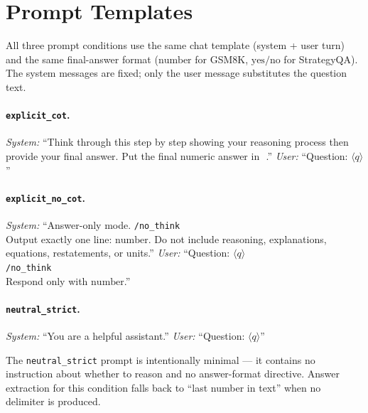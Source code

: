 \documentclass{article}
\theoremstyle{plain}
\theoremstyle{definition}
\theoremstyle{remark}
\begin{document}




\appendix

\section{Prompt Templates}
\label{app:prompts}

All three prompt conditions use the same chat template (system + user
turn) and the same final-answer format ($\boxed{\text{number}}$ for
GSM8K, $\boxed{\text{yes/no}}$ for StrategyQA). The system messages are
fixed; only the user message substitutes the question text.

\paragraph{\texttt{explicit\_cot}.}
\textit{System:}
``Think through this step by step showing your reasoning process then
provide your final answer. Put the final numeric answer in
$\boxed{\,\,}$.''
\textit{User:} ``Question: $\langle q\rangle$''

\paragraph{\texttt{explicit\_no\_cot}.}
\textit{System:}
``Answer-only mode. \texttt{/no\_think}\\
Output exactly one line: $\boxed{\text{number}}$. Do not include
reasoning, explanations, equations, restatements, or units.''
\textit{User:}
``Question: $\langle q\rangle$\\
\texttt{/no\_think}\\
Respond only with $\boxed{\text{number}}$.''

\paragraph{\texttt{neutral\_strict}.}
\textit{System:} ``You are a helpful assistant.''
\textit{User:} ``Question: $\langle q\rangle$''

The \texttt{neutral\_strict} prompt is intentionally minimal --- it
contains no instruction about whether to reason and no answer-format
directive. Answer extraction for this condition falls back to
``last number in text'' when no $\boxed{}$ delimiter is produced.
\end{document}
